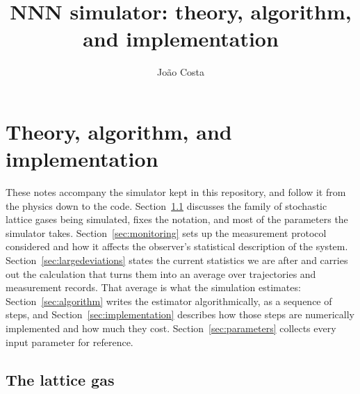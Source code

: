 \documentclass[11pt]{article}
\title{NNN simulator: theory, algorithm, and implementation}
\author{João Costa}
\date{}
\DeclareMathOperator{\Tr}{Tr}
\begin{document}
\maketitle
\tableofcontents

\section{Theory, algorithm, and implementation}

%



These notes accompany the simulator kept in this repository, and follow it from the physics down to the code. Section~\ref{sec:simulated-model} discusses the family of stochastic lattice gases being simulated, fixes the notation, and most of the parameters the simulator takes. Section~\ref{sec:monitoring} sets up the measurement protocol considered and how it affects the observer's statistical description of the system. Section~\ref{sec:largedeviations} states the current statistics we are after and carries out the calculation that turns them into an average over trajectories and measurement records. That average is what the simulation estimates: Section~\ref{sec:algorithm} writes the estimator algorithmically, as a sequence of steps, and Section~\ref{sec:implementation} describes how those steps are numerically implemented and how much they cost. Section~\ref{sec:parameters} collects every input parameter for reference.

\subsection{The lattice gas}
\label{sec:simulated-model}
\end{document}
